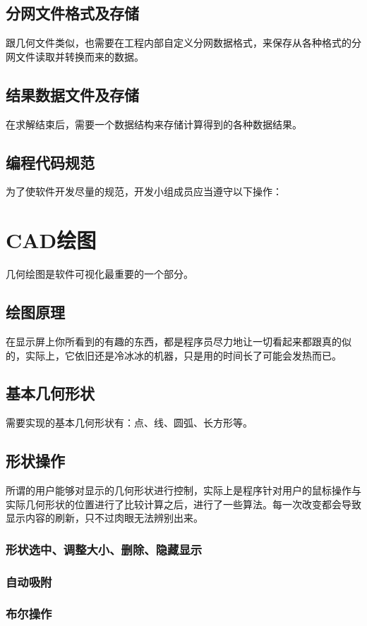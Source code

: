 \subsection{分网文件格式及存储}
跟几何文件类似，也需要在工程内部自定义分网数据格式，来保存从各种格式的分网文件读取并转换而来的数据。
\subsection{结果数据文件及存储}
在求解结束后，需要一个数据结构来存储计算得到的各种数据结果。
\subsection{编程代码规范}
为了使软件开发尽量的规范，开发小组成员应当遵守以下操作：
\section{CAD绘图}
几何绘图是软件可视化最重要的一个部分。
\subsection{绘图原理}
在显示屏上你所看到的有趣的东西，都是程序员尽力地让一切看起来都跟真的似的，实际上，它依旧还是冷冰冰的机器，只是用的时间长了可能会发热而已。
\subsection{基本几何形状}
需要实现的基本几何形状有：点、线、圆弧、长方形等。
\subsection{形状操作}
所谓的用户能够对显示的几何形状进行控制，实际上是程序针对用户的鼠标操作与实际几何形状的位置进行了比较计算之后，进行了一些算法。每一次改变都会导致显示内容的刷新，只不过肉眼无法辨别出来。
\subsubsection{形状选中、调整大小、删除、隐藏显示}

\subsubsection{自动吸附}

\subsubsection{布尔操作}

